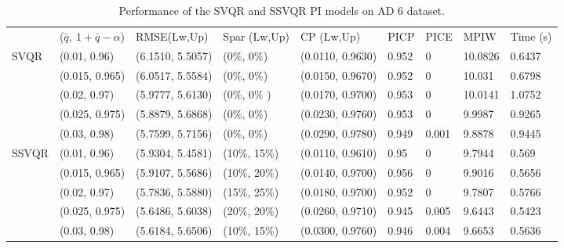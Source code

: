 \documentclass[10pt]{article} %
\begin{document}
\begin{table}
    {\fontsize{9}{9}\selectfont 
    \begin{tabular}{|l|l|l|l|l|l|l|l|l|}
\cline{1-9}
        & ($\bar{q},~1+\bar{q}-\alpha$)              & RMSE(Lw,Up)   & Spar (Lw,Up)     & CP (Lw,Up)     & PICP  & PICE & MPIW   & Time (s) \\ \cline{1-9} 
\multirow{5}{*}{SVQR} & 
        (0.01, 0.96) & (6.1510, 5.5057) & (0\%, 0\%) & (0.0110, 0.9630) & 0.952 & 0 & 10.0826 & 0.6437 \\ 
      &  (0.015, 0.965) & (6.0517, 5.5584) & (0\%, 0\%) & (0.0150, 0.9670) & 0.952 & 0 & 10.031 & 0.6798 \\ 
     &   (0.02, 0.97) & (5.9777, 5.6130) & (0\%, 0\% )& (0.0170, 0.9700) & 0.953 & 0 & 10.0141 & 1.0752 \\ 
     &   (0.025, 0.975) & (5.8879, 5.6868) & (0\%, 0\%) & (0.0230, 0.9760) & 0.953 & 0 & 9.9987 & 0.9265 \\ 
     &   (0.03, 0.98) & (5.7599, 5.7156) & (0\%, 0\%) & (0.0290, 0.9780) & 0.949 & 0.001 & 9.8878 & 0.9445 \\ \hline
        
       \multirow{5}{*}{SSVQR} &  (0.01, 0.96) & (5.9304, 5.4581) & (10\%, 15\%) & (0.0110, 0.9610) & 0.95 & 0 & 9.7944 & 0.569 \\ 
      &  (0.015, 0.965) & (5.9107, 5.5686) & (10\%, 20\%) & (0.0140, 0.9700) & 0.956 & 0 & 9.9016 & 0.5656 \\ 
      &  (0.02, 0.97) & (5.7836, 5.5880) & (15\%, 25\%) & (0.0180, 0.9700) & 0.952 & 0 & 9.7807 & 0.5766 \\ 
      &  (0.025, 0.975) & (5.6486, 5.6038) & (20\%, 20\%) & (0.0260, 0.9710) & 0.945 & 0.005 & 9.6443 & 0.5423 \\ 
      &  (0.03, 0.98) & (5.6184, 5.6506) & (10\%, 15\%) & (0.0300, 0.9760) & 0.946 & 0.004 & 9.6653 & 0.5636 \\ \hline
    \end{tabular}}
    \caption{Performance of the SVQR and SSVQR PI models on AD 6 dataset.}
\label{AD6}
\end{table}
\end{document}
